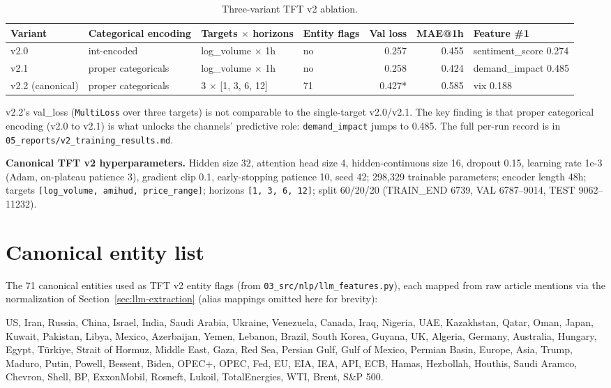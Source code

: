 \begin{table}[h]
  \centering
  \small
  \caption{Three-variant TFT v2 ablation.}
  \label{tab:ablation}
  \begin{tabular}{@{}llllrrl@{}}
    \toprule
    Variant & Categorical encoding & Targets $\times$ horizons & Entity flags & Val loss & MAE@1h & Feature \#1 \\
    \midrule
    v2.0 & int-encoded & log\_volume $\times$ 1h & no & 0.257 & 0.455 & sentiment\_score 0.274 \\
    v2.1 & proper categoricals & log\_volume $\times$ 1h & no & 0.258 & 0.424 & demand\_impact 0.485 \\
    v2.2 (canonical) & proper categoricals & 3 $\times$ [1, 3, 6, 12] & 71 & 0.427* & 0.585 & vix 0.188 \\
    \bottomrule
  \end{tabular}
\end{table}

\noindent* v2.2's val\_loss (\texttt{MultiLoss} over three targets) is not comparable to the single-target v2.0/v2.1. The key finding is that proper categorical encoding (v2.0 to v2.1) is what unlocks the channels' predictive role: \texttt{demand\_impact} jumps to 0.485. The full per-run record is in \texttt{05\_reports/v2\_training\_results.md}.

\textbf{Canonical TFT v2 hyperparameters.} Hidden size 32, attention head size 4, hidden-continuous size 16, dropout 0.15, learning rate 1e-3 (Adam, on-plateau patience 3), gradient clip 0.1, early-stopping patience 10, seed 42; 298{,}329 trainable parameters; encoder length 48h; targets \texttt{[log\_volume, amihud, price\_range]}; horizons \texttt{[1, 3, 6, 12]}; split 60/20/20 (TRAIN\_END 6739, VAL 6787--9014, TEST 9062--11232).

\chapter{Canonical entity list}\label{app:entities}

The 71 canonical entities used as TFT v2 entity flags (from \texttt{03\_src/nlp/llm\_features.py}), each mapped from raw article mentions via the normalization of Section~\ref{sec:llm-extraction} (alias mappings omitted here for brevity):

\medskip
\noindent US, Iran, Russia, China, Israel, India, Saudi Arabia, Ukraine, Venezuela, Canada, Iraq, Nigeria, UAE, Kazakhstan, Qatar, Oman, Japan, Kuwait, Pakistan, Libya, Mexico, Azerbaijan, Yemen, Lebanon, Brazil, South Korea, Guyana, UK, Algeria, Germany, Australia, Hungary, Egypt, T\"urkiye, Strait of Hormuz, Middle East, Gaza, Red Sea, Persian Gulf, Gulf of Mexico, Permian Basin, Europe, Asia, Trump, Maduro, Putin, Powell, Bessent, Biden, OPEC+, OPEC, Fed, EU, EIA, IEA, API, ECB, Hamas, Hezbollah, Houthis, Saudi Aramco, Chevron, Shell, BP, ExxonMobil, Rosneft, Lukoil, TotalEnergies, WTI, Brent, S\&P 500.

